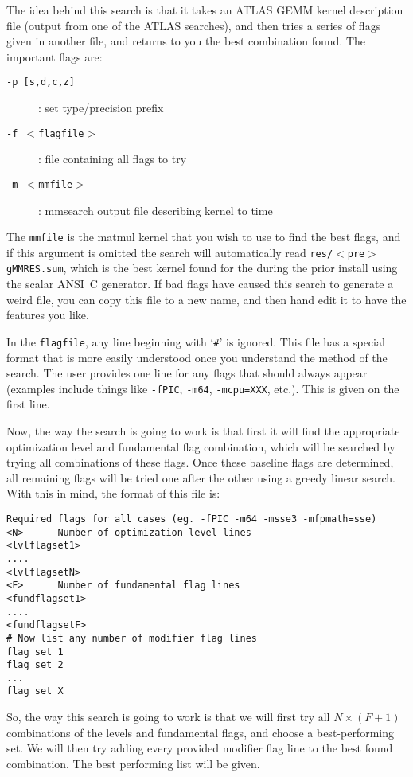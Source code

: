 \documentclass[11pt]{article}
\begin{document}
The idea behind this search is that it takes an ATLAS GEMM kernel description
file (output from one of the ATLAS searches), and then tries a series of
flags given in another file, and returns to you the best combination found.
The important flags are:
\begin{description}
\item [{\tt -p [s,d,c,z]}] : set type/precision prefix
\vspace*{-0.1in}
\item [{\tt -f $<$flagfile$>$}]: file containing all flags to try
\vspace*{-0.1in}
\item [{\tt -m $<$mmfile$>$}]: mmsearch output file describing kernel to time
\end{description}

The {\tt mmfile} is the matmul kernel that you wish to use to find the
best flags, and if this argument is omitted the search will automatically
read {\tt res/$<$pre$>$gMMRES.sum}, which is the best kernel found for the
during the prior install using the scalar ANSI~C generator.  If bad flags
have caused this search to generate a weird file, you can copy this file
to a new name, and then hand edit it to have the features you like.

In the {\tt flagfile}, any line beginning with `\verb+#+' is ignored.
This file has a special format that is more easily understood once 
you understand the method of the search.  The user provides one line
for any flags that should always appear (examples include things like
{\tt -fPIC}, {\tt -m64}, {\tt -mcpu=XXX}, etc.).  This is given on the
first line.

Now, the way the search is going to work is that first it will find
the appropriate optimization level and fundamental flag combination,
which will be searched by trying all combinations of these flags.
Once these baseline flags are determined, all remaining flags will
be tried one after the other using a greedy linear search.
With this in mind, the format of this file is:
\begin{verbatim}
Required flags for all cases (eg. -fPIC -m64 -msse3 -mfpmath=sse)
<N>      Number of optimization level lines
<lvlflagset1>
....
<lvlflagsetN>
<F>      Number of fundamental flag lines
<fundflagset1>
....
<fundflagsetF>
# Now list any number of modifier flag lines
flag set 1
flag set 2
...
flag set X
\end{verbatim}

So, the way this search is going to work is that we will first try all
$N \times (F+1)$ combinations of the levels and fundamental flags, and
choose a best-performing set.  We will then try adding every provided modifier
flag line to the best found combination.  The best performing list will be 
given.  
\end{document}
